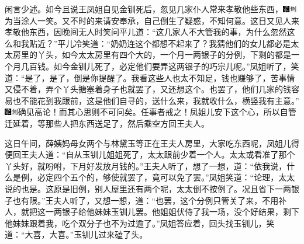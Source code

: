 闲言少述。如今且说王凤姐自见金钏死后，忽见几家仆人常来孝敬他些东西，{\includegraphics[width=3mm]{../Images/00006}\includegraphics[width=3mm]{../Images/00011}\footnotesize \kaishu 为当涂人一笑。}又不时的来请安奉承，自己倒生了疑惑，不知何意。这日又见人来孝敬他东西，因晚间无人时笑问平儿道：``这几家人不大管我的事，为什么忽然这么和我贴近？''平儿冷笑道：``奶奶连这个都想不起来了？我猜他们的女儿都必是太太房里的丫头，如今太太房里有四个大的，一个月一两银子的分例，下剩的都是一个月几百钱。如今金钏儿死了，必定他们要弄这两银子的巧宗儿呢。''凤姐听了，笑道：``是了，是了，倒是你提醒了。我看这些人也太不知足，钱也赚够了，苦事情又侵不着，弄个丫头搪塞着身子也就罢了，又还想这个。也罢了，他们几家的钱容易也不能花到我跟前，这是他们自寻的，送什么来，我就收什么，横竖我有主意。''{\includegraphics[width=3mm]{../Images/00006}\includegraphics[width=3mm]{../Images/00011}\footnotesize \kaishu 确见高论！而其心思则不可问矣。任事者戒之！}凤姐儿安下这个心，所以自管迁延着，等那些人把东西送足了，然后乘空方回王夫人。

这日午间，薛姨妈母女两个与林黛玉等正在王夫人房里，大家吃东西呢，凤姐儿得便回王夫人道：``自从玉钏儿姐姐死了，太太跟前少着一个人。太太或看准了那个丫头好，就吩咐，下月好发放月钱的。''王夫人听了，想了一想，道：``依我说，什么是例，必定四个五个的，够使就罢了，竟可以免了罢。''凤姐笑道：``论理，太太说的也是。这原是旧例，别人屋里还有两个呢，太太倒不按例了。况且省下一两银子也有限。''王夫人听了，又想一想，道：``也罢，这个分例只管关了来，不用补人，就把这一两银子给他妹妹玉钏儿罢。他姐姐伏侍了我一场，没个好结果，剩下他妹妹跟着我，吃个双分子也不为过逾了。''凤姐答应着，回头找玉钏儿，笑道：``大喜，大喜。''玉钏儿过来磕了头。


